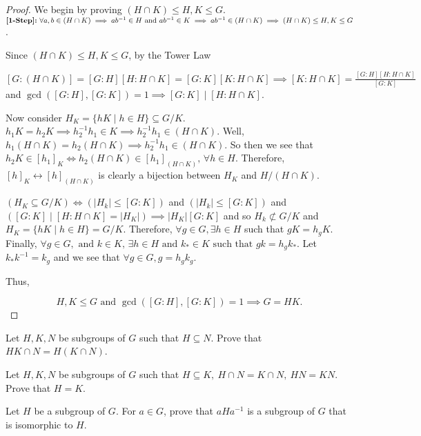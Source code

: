 \documentclass[addpoints,10pt]{exam}
\theoremstyle{plain}
\theoremstyle{definition}
\newtheorem{prob}[thm]{Problem}
\theoremstyle{plain}
\theoremstyle{plain}
\theoremstyle{definition}
\let\oldprob\prob
\let\endoldprob\endprob
\renewenvironment{prob}
  {\begin{singlespace}\oldprob}
  {\endoldprob\end{singlespace}}
\newcommand{\belowtitle}{\leavevmode\newline}
\newcommand{\Observe}{\text{Observe.}}
\begin{document}
\begin{proof}
  We begin by proving $(H\cap K)\leq H,K\leq G$.\belowtitle
  $\textbf{[1-Step]:\;}\forall a,b\in (H\cap K)\implies ab^{-1}\in H\text{ and }ab^{-1}\in K\implies ab^{-1}\in (H\cap K)\implies (H\cap K)\leq H,K\leq G$.

  Since $(H\cap K)\leq H,K \leq G$, by the Tower Law
  \begin{center}
    $[G:(H\cap K)]=[G:H][H:H\cap K]=[G:K][K:H\cap K]\implies [K:H\cap K]=\frac{[G:H][H:H\cap K]}{[G:K]}$\newline
    and $\gcd([G:H],[G:K])=1\implies [G:K]\mid [H:H\cap K]$.
  \end{center}

  Now consider $H_{K}=\{hK\mid h\in H\}\subseteq G/K$. $h_{1}K=h_{2}K\implies h_{2}^{-1}h_{1}\in K\implies h_{2}^{-1}h_{1}\in (H\cap K).$ Well, $h_{1}(H\cap K)=h_{2}(H\cap K)\implies h_{2}^{-1}h_{1}\in (H\cap K)$. So then we see that $h_{2}K\in [h_{1}]_{K}\iff h_{2}(H\cap K)\in [h_{1}]_{(H\cap K)},\,\forall h\in H.$ Therefore, $[h]_{K}\leftrightarrow [h]_{(H\cap K)}$ is clearly a bijection between $H_{K}$ and $H/(H\cap K)$. \Observe

  $(H_{K}\subseteq G/K)\iff (|H_{k}|\leq [G:K])$ and $(|H_{k}|\leq [G:K])$ and $([G:K]\mid [H:H\cap K]=|H_{K}|)\implies |H_{K}|[G:K]$ and so $H_{k}\not\subset G/K$ and $H_{K}=\{hK\mid h\in H\}=G/K.$ Therefore, $\forall g\in G,\exists h\in H$ such that $gK=h_{g}K$. Finally, $\forall g\in G,\text{ and }k\in K,\,\exists h\in H\text{ and }k_{*}\in K\text{ such that }gk=h_{g}k_{*}$. Let $k_{*}k^{-1}=k_{g}$ and we see that $\forall g\in G, g=h_{g}k_{g}$.

  Thus,

  $$H,K\leq G\text{ and }\gcd([G:H],[G:K])=1\implies G=HK.$$

\end{proof}
\begin{prob}
Let $H,K,N$ be subgroups of $G$ such that $H\subseteq N$. Prove that $HK\cap N = H(K\cap N)$.
\end{prob}

\begin{prob}
Let $H,K,N$ be subgroups of $G$ such that $H\subseteq K,\ H\cap N=K\cap N,\ HN=KN$. Prove that $H=K$.
\end{prob}

\begin{prob}
Let $H$ be a subgroup of $G$. For $a\in G$, prove that $aHa^{-1}$ is a subgroup of $G$ that is isomorphic to $H$.
\end{prob}
\end{document}
